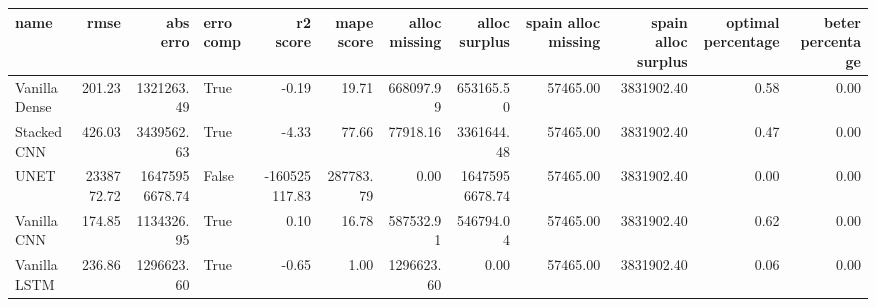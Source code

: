 \begin{tabular}{lrrlrrrrrrrr}
\toprule
name & rmse & abs erro & erro comp & r2 score & mape score & alloc missing & alloc surplus & spain alloc missing & spain alloc surplus & optimal percentage & beter percentage \\
\midrule
VanillaDense & 201.23 & 1321263.49 & True & -0.19 & 19.71 & 668097.99 & 653165.50 & 57465.00 & 3831902.40 & 0.58 & 0.00 \\
StackedCNN & 426.03 & 3439562.63 & True & -4.33 & 77.66 & 77918.16 & 3361644.48 & 57465.00 & 3831902.40 & 0.47 & 0.00 \\
UNET & 2338772.72 & 16475956678.74 & False & -160525117.83 & 287783.79 & 0.00 & 16475956678.74 & 57465.00 & 3831902.40 & 0.00 & 0.00 \\
VanillaCNN & 174.85 & 1134326.95 & True & 0.10 & 16.78 & 587532.91 & 546794.04 & 57465.00 & 3831902.40 & 0.62 & 0.00 \\
VanillaLSTM & 236.86 & 1296623.60 & True & -0.65 & 1.00 & 1296623.60 & 0.00 & 57465.00 & 3831902.40 & 0.06 & 0.00 \\
\bottomrule
\end{tabular}
